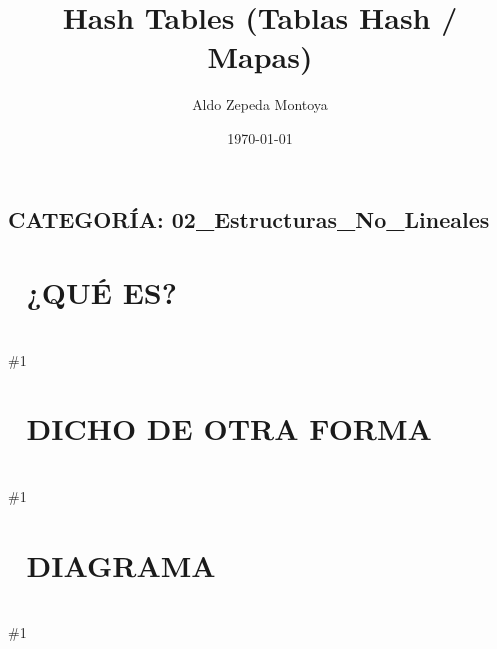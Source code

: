 \documentclass{article}
\newcommand{\quees}[1]{
    \section*{🤔 ¿QUÉ ES?}
    \hrulefill \\
    \#1
}
\newcommand{\dichodeotraforma}[1]{
    \section*{💬 DICHO DE OTRA FORMA}
    \hrulefill \\
    \#1
}
\newcommand{\diagrama}[1]{
    \section*{🎨 DIAGRAMA}
    \hrulefill \\
    \#1
}
\begin{document}
\title{Hash Tables (Tablas Hash / Mapas)}
\author{Aldo Zepeda Montoya}
\date{\today}
\maketitle

\subsection*{CATEGORÍA: 02\_Estructuras\_No\_Lineales}

\quees{
Un casillero de escuela 🎒. Cada estudiante tiene un número de
casillero asignado por una fórmula mágica (la Hash Function).

Para guardar la mochila de "Carlos", aplicas la fórmula: 
Hash("Carlos") = 42. Vas directo al casillero 42 y la guardas. 
Para buscarla, vuelves a aplicar la fórmula: Hash("Carlos") = 42,
y vas DIRECTO al casillero 42.

¡No tienes que revisar todos los casilleros uno por uno! Es como 
tener un acceso instantáneo a cualquier dato si conoces su "llave".
}

\dichodeotraforma{
Una Hash Table es una estructura que asocia Llaves (Keys) con Valores
(Values). Usa una función matemática para convertir la Key en un 
índice de un array.

El objetivo principal es lograr operaciones de búsqueda, inserción y 
eliminación en tiempo constante promedio O(1). Es la estructura más 
eficiente para búsquedas rápidas en la industria.
}

\diagrama{\begin{verbatim}
Key: "Carlos"  --> [ Hash Function ] --> Index: 2
Key: "Maria"   --> [ Hash Function ] --> Index: 5

Array Interno (Buckets):
[0] : NULL
[1] : NULL
[2] : {Key: "Carlos", Value: "Mochila Azul"}
[3] : NULL
[4] : NULL
[5] : {Key: "Maria",  Value: "Mochila Roja"}

Colisión (Collision):
Si Hash("Juan") también da 2, ocurre una colisión. 
Solución común: Chaining (una Linked List en el índice 2).

[2] : ["Carlos"] -> ["Juan"] -> NULL
\end{verbatim}}
\end{document}
